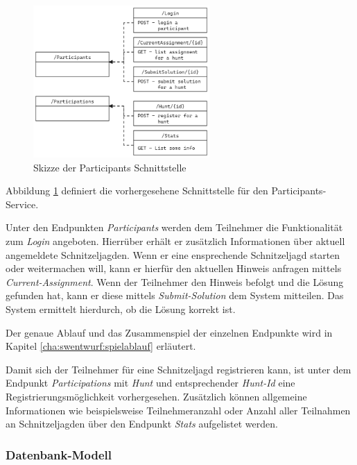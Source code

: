 \begin{figure}[H]
    \centering
    \includegraphics[width=0.6\textwidth]{images/PrAr-Software-Entwurf-Hunt-Api-Participant-Service-Endpoints.png}
    \caption{Skizze der Participants Schnittstelle}
    \label{fig:swentwurf:huntapi:participantservice:endpoints}
\end{figure}

Abbildung \ref{fig:swentwurf:huntapi:participantservice:endpoints} definiert die vorhergesehene Schnittstelle für den Participants-Service.

Unter den Endpunkten \textit{Participants} werden dem Teilnehmer die Funktionalität zum \textit{Login} angeboten. Hierrüber erhält er zusätzlich Informationen über aktuell angemeldete Schnitzeljagden. Wenn er eine ensprechende Schnitzeljagd starten oder weitermachen will, kann er hierfür den aktuellen Hinweis anfragen mittels \textit{Current-Assignment}. Wenn der Teilnehmer den Hinweis befolgt und die Lösung gefunden hat, kann er diese mittels \textit{Submit-Solution} dem System mitteilen. Das System ermittelt hierdurch, ob die Lösung korrekt ist.

Der genaue Ablauf und das Zusammenspiel der einzelnen Endpunkte wird in Kapitel \ref{cha:swentwurf:spielablauf} erläutert.

Damit sich der Teilnehmer für eine Schnitzeljagd registrieren kann, ist unter dem Endpunkt \textit{Participations} mit \textit{Hunt} und entsprechender \textit{Hunt-Id} eine Registrierungsmöglichkeit vorhergesehen. Zusätzlich können allgemeine Informationen wie beispielsweise Teilnehmeranzahl oder Anzahl aller Teilnahmen an Schnitzeljagden über den Endpunkt \textit{Stats} aufgelistet werden.

\subsubsection{Datenbank-Modell}

